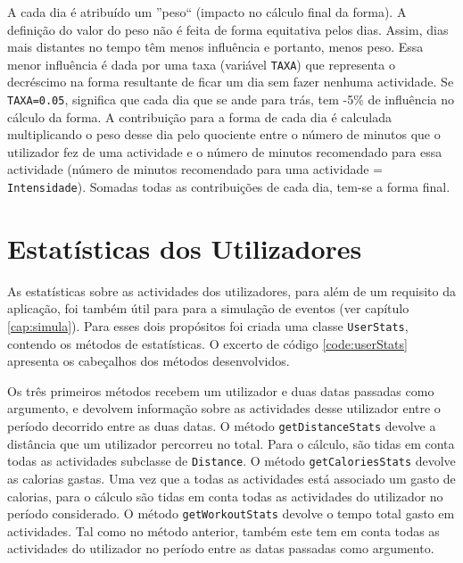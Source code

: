 \documentclass[a4paper,10pt]{report}
\begin{document}
A cada dia é atribuído um ''peso`` (impacto no cálculo final da forma). 
A definição do valor do peso não é feita de forma equitativa pelos dias. Assim, dias mais distantes no tempo têm menos influência e portanto, 
menos peso. Essa menor influência é dada por uma taxa (variável \verb!TAXA!) que representa o decréscimo na forma resultante de ficar um dia sem 
fazer nenhuma actividade. Se \verb!TAXA=0.05!, significa que cada dia que se ande para trás, tem -5\% de influência no cálculo da forma.
A contribuição para a forma de cada dia é calculada multiplicando o peso desse dia pelo quociente entre o número de minutos que o utilizador 
fez de uma actividade e o número de minutos recomendado para essa actividade (número de minutos recomendado para uma actividade = \verb!Intensidade!). 
Somadas todas as contribuições de cada dia, tem-se a forma final.

\newpage
\phantom{placeholder} %
\thispagestyle{empty} %
\chapter{Estatísticas dos Utilizadores}
\label{cap:estatisticas}
As estatísticas sobre as actividades dos utilizadores, para além de um requisito da aplicação, 
foi também útil para para a simulação de eventos (ver capítulo \ref{cap:simula}). 
Para esses dois propósitos foi criada uma classe \verb!UserStats!, contendo os métodos de estatísticas. 
O excerto de código \ref{code:userStats} apresenta os cabeçalhos dos métodos desenvolvidos.

Os três primeiros métodos recebem um utilizador e duas datas passadas como argumento, e devolvem informação sobre as actividades desse utilizador 
entre o período decorrido entre as duas datas.
O método \verb!getDistanceStats! devolve a distância que um utilizador percorreu no total. 
Para o cálculo, são tidas em conta todas as actividades subclasse de \verb!Distance!.
O método \verb!getCaloriesStats! devolve as calorias gastas. 
Uma vez que a todas as actividades está associado um gasto de calorias, para o cálculo são tidas em conta todas 
as actividades do utilizador no período considerado.
O método \verb!getWorkoutStats! devolve o tempo total gasto em actividades. 
Tal como no método anterior, também este tem em conta todas as actividades do utilizador no período entre as datas passadas como argumento.
\end{document}
